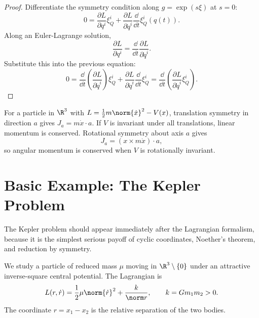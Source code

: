 \begin{proof}
Differentiate the symmetry condition along \(g=\exp(s\xi)\) at \(s=0\):
\[
  0=
  \frac{\partial L}{\partial q^i}\xi_Q^i
  +
  \frac{\partial L}{\partial \dot q^i}
  \frac{\dd}{\dd t}\xi_Q^i(q(t)).
\]
Along an Euler-Lagrange solution,
\[
  \frac{\partial L}{\partial q^i}
  =
  \frac{\dd}{\dd t}\frac{\partial L}{\partial \dot q^i}.
\]
Substitute this into the previous equation:
\[
  0=
  \frac{\dd}{\dd t}\left(\frac{\partial L}{\partial \dot q^i}\right)\xi_Q^i
  +
  \frac{\partial L}{\partial \dot q^i}
  \frac{\dd}{\dd t}\xi_Q^i
  =
  \frac{\dd}{\dd t}
  \left(
    \frac{\partial L}{\partial \dot q^i}\xi_Q^i
  \right).
\]
\end{proof}

\begin{example}
For a particle in \(\R^3\) with \(L=\frac12m\norm{\dot x}^2-V(x)\), translation
symmetry in direction \(a\) gives \(J_a=m\dot x\cdot a\). If \(V\) is invariant
under all translations, linear momentum is conserved. Rotational symmetry about
axis \(a\) gives
\[
  J_a=(x\times m\dot x)\cdot a,
\]
so angular momentum is conserved when \(V\) is rotationally invariant.
\end{example}

\section{Basic Example: The Kepler Problem}
\label{sec:kepler-lagrangian}

The Kepler problem should appear immediately after the Lagrangian formalism,
because it is the simplest serious payoff of cyclic coordinates, Noether's
theorem, and reduction by symmetry.

\begin{assumption}
We study a particle of reduced mass \(\mu\) moving in \(\R^3\setminus\{0\}\)
under an attractive inverse-square central potential. The Lagrangian is
\[
  L(r,\dot r)
  =
  \frac12\mu\norm{\dot r}^2+\frac{k}{\norm r},
  \qquad
  k=Gm_1m_2>0.
\]
The coordinate \(r=x_1-x_2\) is the relative separation of the two bodies.
\end{assumption}


